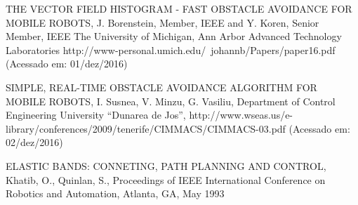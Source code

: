 \renewcommand{\section}[2]{}
\begin{thebibliography}{depth}

 THE VECTOR FIELD HISTOGRAM - FAST OBSTACLE AVOIDANCE FOR MOBILE ROBOTS, J. Borenstein, Member, IEEE and Y. Koren, Senior Member, IEEE The University of Michigan, Ann Arbor Advanced Technology Laboratories  http://www-personal.umich.edu/~johannb/Papers/paper16.pdf (Acessado em: 01/dez/2016)

 SIMPLE, REAL-TIME OBSTACLE AVOIDANCE ALGORITHM FOR MOBILE ROBOTS, I. Susnea, V. Minzu, G. Vasiliu, Department of Control Engineering University “Dunarea de Jos”,  http://www.wseas.us/e-library/conferences/2009/tenerife/CIMMACS/CIMMACS-03.pdf (Acessado em: 02/dez/2016)

 ELASTIC BANDS: CONNETING, PATH PLANNING AND CONTROL, Khatib, O., Quinlan, S., Proceedings of IEEE International Conference on Robotics and Automation, Atlanta, GA, May 1993

\end{thebibliography}